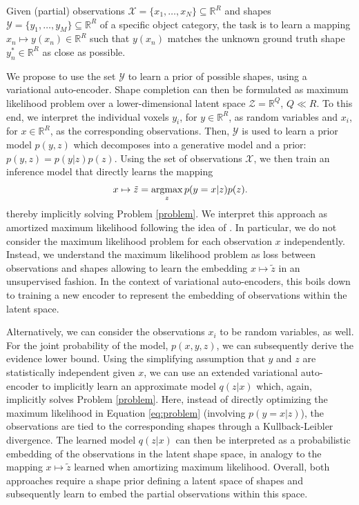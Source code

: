\begin{problem}%
  \label{problem}
  Given (partial) observations
  $\mathcal{X} = \{x_1,\ldots,x_N\} \subseteq \mathbb{R}^R$
  and shapes $\mathcal{Y} = \{y_1, \ldots,y_M\} \subseteq \mathbb{R}^R$ of a specific object
  category, the task is to learn a mapping $x_n \mapsto y(x_n) \in \mathbb{R}^R$
  such that $y(x_n)$ matches the unknown ground truth
  shape $y^*_n \in \mathbb{R}^R$ as close as possible.
\end{problem}

We propose to use the set $\mathcal{Y}$ to learn a prior of possible shapes, \eg
using a variational auto-encoder. Shape completion can then be formulated as maximum
likelihood problem over a lower-dimensional latent space $\mathcal{Z} = \mathbb{R}^Q$,
$Q \ll R$. To this end, we interpret the individual voxels $y_i$, for $y \in \mathbb{R}^R$,
as random variables and $x_i$, for $x \in \mathbb{R}^R$, as the corresponding observations.
Then, $\mathcal{Y}$ is used to learn a prior model $p(y, z)$ which
decomposes into a generative model and a prior: $p(y, z) = p(y | z) p(z)$.
Using the set of observations $\mathcal{X}$, we then train an inference model
that directly learns the mapping
\begin{align}
  x \mapsto \tilde{z} = \operatorname*{argmax}_{z} p(y = x | z) p(z).\label{eq:problem}
\end{align}
thereby implicitly solving Problem \ref{problem}. We interpret this approach
as amortized maximum likelihood following the idea of \cite{GershamGoodman:2014}.
In particular, we do not consider the maximum likelihood problem for each
observation $x$ independently. Instead, we understand the maximum likelihood
problem as loss between observations and shapes allowing to learn the
embedding $x \mapsto \tilde{z}$ in an unsupervised fashion. In the context
of variational auto-encoders, this boils down to training a new encoder to
represent the embedding of observations within the latent space.

Alternatively, we can consider the observations $x_i$ to be random variables, as well.
For the joint probability of the model, \ie $p(x, y, z)$, we can subsequently
derive the evidence lower bound. Using the simplifying assumption that $y$ and
$z$ are statistically independent given $x$, %
we can use an extended variational auto-encoder to implicitly learn an approximate
model $q(z | x)$ which, again,
implicitly solves Problem \ref{problem}. Here, instead of directly
optimizing the maximum likelihood in Equation \eqref{eq:problem} (involving
$p(y = x | z)$), the observations are tied to the corresponding shapes through
a Kullback-Leibler divergence.
The learned model $q(z | x)$ can then be interpreted as a probabilistic embedding
of the observations in the latent shape space, in analogy to the
mapping $x \mapsto \tilde{z}$ learned when amortizing maximum likelihood.
Overall, both approaches require a shape prior defining a latent space
of shapes and subsequently learn to embed the partial observations within
this space.
